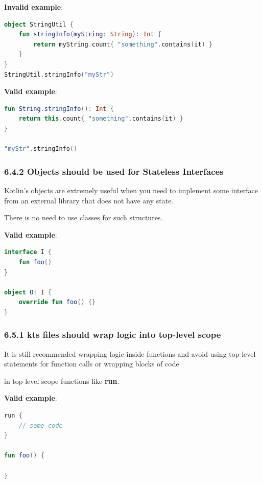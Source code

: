 \textbf{Invalid example}:

\begin{lstlisting}[language=Kotlin]
object StringUtil {
    fun stringInfo(myString: String): Int {
        return myString.count{ "something".contains(it) }
    }
}
StringUtil.stringInfo("myStr")
\end{lstlisting}


\textbf{Valid example}:

\begin{lstlisting}[language=Kotlin]
fun String.stringInfo(): Int {
    return this.count{ "something".contains(it) }
}

"myStr".stringInfo()
\end{lstlisting}


\subsubsection*{\textbf{6.4.2 Objects should be used for Stateless Interfaces}}
\leavevmode\newline

\label{sec:6.4.2}

Kotlin’s objects are extremely useful when you need to implement some interface from an external library that does not have any state.

There is no need to use classes for such structures.



\textbf{Valid example}:

\begin{lstlisting}[language=Kotlin]
interface I {
    fun foo()
}

object O: I {
    override fun foo() {}
}
\end{lstlisting}


\subsubsection*{\textbf{6.5.1 kts files should wrap logic into top-level scope}}
\leavevmode\newline

\label{sec:6.5.1}

It is still recommended wrapping logic inside functions and avoid using top-level statements for function calls or wrapping blocks of code

in top-level scope functions like \textbf{run}.



\textbf{Valid example}:

\begin{lstlisting}[language=Kotlin]
run {
    // some code
}

fun foo() {

}
\end{lstlisting}